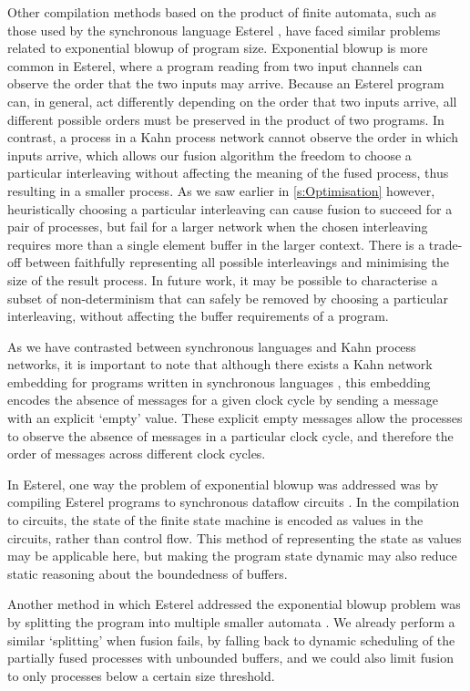 Other compilation methods based on the product of finite automata, such as those used by the synchronous language Esterel \citep{berry2000foundations}, have faced similar problems related to exponential blowup of program size.
Exponential blowup is more common in Esterel, where a program reading from two input channels can observe the order that the two inputs may arrive.
Because an Esterel program can, in general, act differently depending on the order that two inputs arrive, all different possible orders must be preserved in the product of two programs.
In contrast, a process in a Kahn process network cannot observe the order in which inputs arrive, which allows our fusion algorithm the freedom to choose a particular interleaving without affecting the meaning of the fused process, thus resulting in a smaller process.
As we saw earlier in \cref{s:Optimisation} however, heuristically choosing a particular interleaving can cause fusion to succeed for a pair of processes, but fail for a larger network when the chosen interleaving requires more than a single element buffer in the larger context.
There is a trade-off between faithfully representing all possible interleavings and minimising the size of the result process.
In future work, it may be possible to characterise a subset of non-determinism that can safely be removed by choosing a particular interleaving, without affecting the buffer requirements of a program.

As we have contrasted between synchronous languages and Kahn process networks, it is important to note that although there exists a Kahn network embedding for programs written in synchronous languages \citep{caspi1996synchronous}, this embedding encodes the absence of messages for a given clock cycle by sending a message with an explicit `empty' value.
These explicit empty messages allow the processes to observe the absence of messages in a particular clock cycle, and therefore the order of messages across different clock cycles.

In Esterel, one way the problem of exponential blowup was addressed was by compiling Esterel programs to synchronous dataflow circuits \citep{berry1992hardware}.
In the compilation to circuits, the state of the finite state machine is encoded as values in the circuits, rather than control flow.
This method of representing the state as values may be applicable here, but making the program state dynamic may also reduce static reasoning about the boundedness of buffers.

Another method in which Esterel addressed the exponential blowup problem was by splitting the program into multiple smaller automata \citep{berry1992esterel}.
We already perform a similar `splitting' when fusion fails, by falling back to dynamic scheduling of the partially fused processes with unbounded buffers, and we could also limit fusion to only processes below a certain size threshold.


